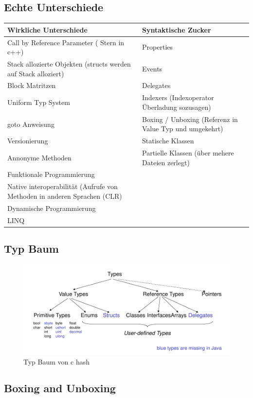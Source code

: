 \documentclass[a4paper,10pt]{scrartcl}
\begin{document}
\subsection{Echte Unterschiede}
\begin{tabular}{|p{7cm}|p{7cm}|}
\hline
 \textbf{Wirkliche Unterschiede} & \textbf{Syntaktische Zucker} \\ 
 \hline
  Call by Reference Parameter ( Stern in c++) & Properties \\ \hline
  Stack allozierte Objekten (structs werden auf Stack alloziert) & Events\\ \hline
  Block Matritzen & Delegates \\
  Uniform Typ System & Indexers (Indexoperator Überladung sozusagen)\\ \hline
  goto Anweisung & Boxing / Unboxing (Referenz in Value Typ  und umgekehrt)\\ \hline
  Versionierung & Statische Klassen \\ \hline
  Annonyme Methoden &  Partielle Klassen (über mehere Dateien zerlegt) \\ \hline
  Funktionale Programmierung & \\ \hline
  Native interoperabilität (Aufrufe von Methoden in anderen Sprachen (CLR) & \\ \hline
  Dynamische Programmierung & \\ \hline
  LINQ & \\ \hline
  \end{tabular}
\subsection{Typ Baum }
\begin{figure}[h]
 \centering
 \includegraphics[scale=0.4]{./type_tree.png}
 \caption{Typ Baum von c hash}
\end{figure}
\pagebreak
\subsection{Boxing and Unboxing}
\end{document}
